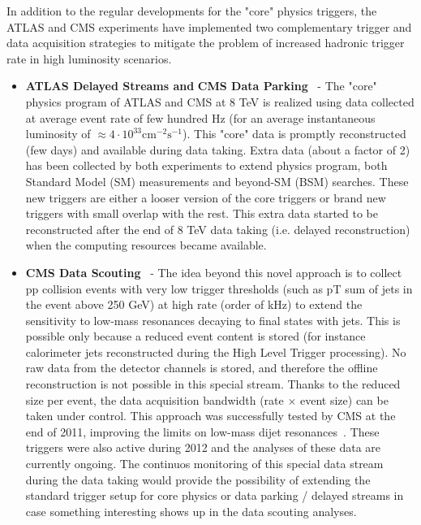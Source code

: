\documentclass{PoS}
\begin{document}
In addition to the regular developments for the "core" physics triggers, the ATLAS and CMS experiments have implemented two complementary trigger and data acquisition strategies to mitigate the problem of increased hadronic trigger rate in high luminosity scenarios.
\begin{itemize}
\item {\bf ATLAS Delayed Streams and} {\bf CMS Data Parking}~\cite{CMS-DP-2012-022} - The "core" physics program of ATLAS and CMS  at 8 TeV is realized using data collected at average event rate of few hundred Hz (for an average instantaneous luminosity of  $\approx 4 \cdot 10^{33} \mbox{cm}^{-2}\mbox{s}^{-1}$). This "core" data is promptly reconstructed (few days) and available during data taking.  Extra data (about a factor of 2) has been collected by both experiments to extend physics program, both Standard Model (SM) measurements and beyond-SM (BSM) searches. 
These new triggers are either a looser version of the core triggers or brand new triggers with small overlap with the rest. This extra data started to be reconstructed after the end of 8 TeV data taking (i.e. delayed reconstruction) when the computing resources became available.
\item {\bf CMS Data Scouting}~\cite{CMS-DP-2012-022} - The idea beyond this novel approach is to collect pp collision events with very low trigger thresholds (such as pT sum of jets in the event above 250 GeV) at high rate (order of kHz) to extend the sensitivity to low-mass resonances decaying to final states with jets. This is possible only because a reduced event content is stored (for instance calorimeter jets reconstructed during the High Level Trigger processing). No raw data from the detector channels is stored, and therefore the offline reconstruction is not possible in this special stream. Thanks to the reduced size per event, the data acquisition bandwidth (rate $\times$ event size) can be taken
under control. This approach was successfully tested by CMS at the end of 2011, improving the limits on low-mass dijet resonances~\cite{CMS-PAS-EXO-11-094}. These triggers were also active during 2012 and the analyses of these data are currently ongoing. The continuos monitoring of this special data stream during the data taking would provide the possibility of extending the standard trigger setup for core physics or data parking / delayed streams in case something interesting shows up in the data scouting analyses. 
\end{itemize}

\end{document}
